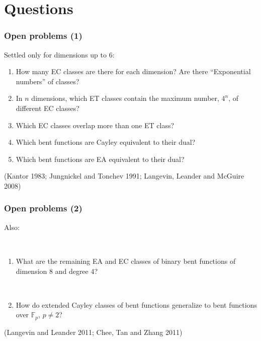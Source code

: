 \documentclass[pdf,sprung,slideColor,nocolorBG]{beamer}
\newenvironment{colortheme}[1]{
\def\ProvidesPackageRCS $##1${\relax}
\renewcommand{\ProcessOptions}{\relax}
\makeatletter

\makeatother
}{}
\newcommand{\slidecite}[1]{\tiny{(#1)}\normalsize{}}
\newcommand{\mb}[1]{\mathbb{#1}}
\newcommand{\F}{\mb{F}}
\begin{document}
\begin{colortheme}{jubata}
\begin{frame}
\begin{figure}
\begin{minipage}{.48\textwidth}
  \label{fig:tau_4_bent_cayley_graph_index_matrix}
\end{minipage}
\end{figure}
\end{frame}
\end{colortheme}

\section{Questions}

\begin{colortheme}{jubata}

\begin{frame}
\frametitle{Open problems (1)}
Settled only for dimensions up to 6:
\begin{enumerate}
\item
How many EC classes are there for each dimension?
Are there ``Exponential numbers'' of classes?
\item
In $n$ dimensions,
which ET classes contain the maximum number, $4^n$, of different EC classes?
\item
Which EC classes overlap more than one ET class?
\item
Which bent functions are Cayley equivalent to their dual?
\item
Which bent functions are EA equivalent to their dual?
\end{enumerate}

\slidecite{Kantor 1983; Jungnickel and Tonchev 1991; Langevin, Leander and McGuire 2008}
\end{frame}

\begin{frame}
\frametitle{Open problems (2)}
Also:

~

\begin{enumerate}
\item
What are the remaining EA and EC classes of binary bent functions of dimension 8 and degree 4?

~

\item
How do extended Cayley classes of bent functions generalize to bent functions over $\F_p$, $p \neq 2$?
\end{enumerate}

\slidecite{Langevin and Leander 2011; Chee, Tan and Zhang 2011}
\end{frame}

\end{colortheme}
\end{document}
